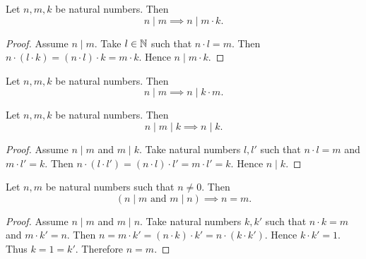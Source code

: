 \documentclass[10pt]{article}
\begin{document}
  \begin{forthel}
    \begin{proposition}
      Let $n, m, k$ be natural numbers.
      Then \[ n \mid m \implies n \mid m \cdot k. \]
    \end{proposition}
    \begin{proof}
      Assume $n \mid m$.
      Take $l \in \mathbb{N}$ such that $n \cdot l = m$.
      Then $n \cdot (l \cdot k)
        = (n \cdot l) \cdot k
        = m \cdot k$.
      Hence $n \mid m \cdot k$.
    \end{proof}
  \end{forthel}

  \begin{forthel}
    \begin{corollary}
      Let $n, m, k$ be natural numbers.
      Then \[ n \mid m \implies n \mid k \cdot m. \]
    \end{corollary}
  \end{forthel}

  \begin{forthel}
    \begin{proposition}
      Let $n, m, k$ be natural numbers.
      Then \[ n \mid m \mid k \implies n \mid k. \]
    \end{proposition}
    \begin{proof}
      Assume $n \mid m$ and $m \mid k$.
      Take natural numbers $l,l'$ such that $n \cdot l = m$ and $m \cdot l' = k$.
      Then $n \cdot (l \cdot l')
        = (n \cdot l) \cdot l'
        = m \cdot l'
        = k$.
      Hence $n \mid k$.
    \end{proof}
  \end{forthel}

  \begin{forthel}
    \begin{proposition}
      Let $n, m$ be natural numbers such that $n \neq 0$.
      Then \[ (\text{$n \mid m$ and $m \mid n$}) \implies n = m. \]
    \end{proposition}
    \begin{proof}
      Assume $n \mid m$ and $m \mid n$.
      Take natural numbers $k,k'$ such that $n \cdot k = m$ and $m \cdot k' = n$.
      Then $n
        = m \cdot k'
        = (n \cdot k) \cdot k'
        = n \cdot (k \cdot k')$.
      Hence $k \cdot k' = 1$.
      Thus $k = 1 = k'$.
      Therefore $n = m$.
    \end{proof}
  \end{forthel}
\end{document}
